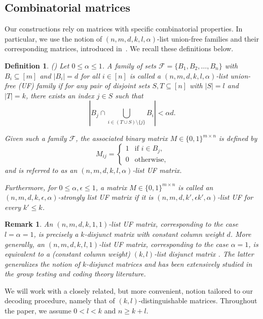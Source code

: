 \documentclass{article}
\newcommand\mc{\mathcal}
\newtheorem{definition}{Definition}[subsection]
\newtheorem{remark}{Remark}[subsection]
\begin{document}
\subsection{Combinatorial matrices} 
Our constructions rely on matrices with specific combinatorial properties. In particular, we use the notion of $(n,m,d,k,l,\alpha)$-list union-free families and their corresponding matrices, introduced in~\cite{matsumoto2023improved}. We recall these definitions below.

\begin{definition}\label{def:basic}
(\cite[Definition~6]{matsumoto2023improved})
Let $0 \leq \alpha \leq 1$. A family of sets $\mc{F} = \{B_1, B_2, \dots, B_n\}$ with $B_i \subseteq [m]$ and $|B_i| = d$ for all $i \in [n]$ is called a $(n,m,d,k,l,\alpha)$-\emph{list union-free (UF) family} if for any pair of disjoint sets $S, T \subseteq [n]$ with $|S| = l$ and $|T| = k$, there exists an index $j \in S$ such that
\[
\left| B_j \cap \bigcup_{i \in (T \cup S)\setminus \{j\}} B_i \right| < \alpha d.
\]

Given such a family $\mc{F}$, the associated binary matrix $M \in \{0,1\}^{m \times n}$ is defined by
\[
M_{ij} =
\begin{cases}
1 & \text{if } i \in B_j,\\
0 & \text{otherwise},
\end{cases}
\]
and is referred to as an $(n,m,d,k,l,\alpha)$-list UF matrix.

Furthermore, for $0 \leq \alpha, \epsilon \leq 1$, a matrix $M \in \{0,1\}^{m \times n}$ is called an $(n,m,d,k,\epsilon,\alpha)$-\emph{strongly list UF} matrix if it is $(n,m,d,k',\epsilon k',\alpha)$-list UF for every $k' \leq k$.
\end{definition}

\begin{remark}
    An $(n,m,d,k,1,1)$-list UF matrix, corresponding to the  case $l=\alpha=1$, is precisely a $k$-disjunct matrix with constant column weight $d$. More generally, an $(n,m,d,k,l,1)$-list UF matrix, corresponding to the case $\alpha=1$, is equivalent to a (constant column weight) $(k,l)$-list disjunct matrix \cite{ngo2011efficiently,matsumoto2023improved}. The latter generalizes the notion of $k$-disjunct matrices and has been extensively studied in the group testing and coding theory literature.
\end{remark}

We will work with a closely related, but more convenient, notion tailored to our decoding procedure, namely that of $(k,l)$-distinguishable matrices. Throughout the paper, we assume $0 < l < k$ and $n\geq k+l$. 
\end{document}
